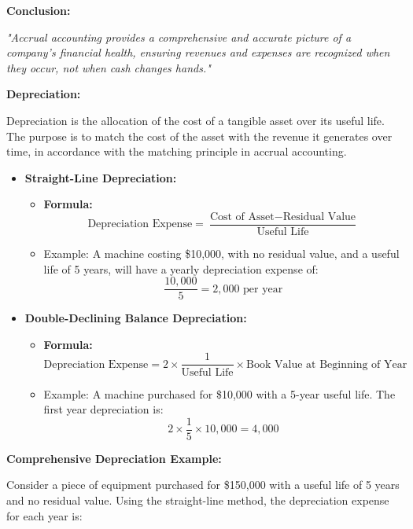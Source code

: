 \documentclass[12pt,a4paper]{book}
\begin{document}
\vspace{0.5cm}
\textbf{Conclusion:}

\textit{"Accrual accounting provides a comprehensive and accurate picture of a company's financial health, ensuring revenues and expenses are recognized when they occur, not when cash changes hands."}

\vspace{1cm}

\textbf{Depreciation:}

Depreciation is the allocation of the cost of a tangible asset over its useful life. The purpose is to match the cost of the asset with the revenue it generates over time, in accordance with the matching principle in accrual accounting.

\begin{itemize}
    \item \textbf{Straight-Line Depreciation:}
    \begin{itemize}
        \item \textbf{Formula:} 
        \[
        \text{Depreciation Expense} = \frac{\text{Cost of Asset} - \text{Residual Value}}{\text{Useful Life}}
        \]
        \item Example: A machine costing \$10,000, with no residual value, and a useful life of 5 years, will have a yearly depreciation expense of:
        \[
        \frac{10,000}{5} = 2,000 \text{ per year}
        \]
    \end{itemize}

    \item \textbf{Double-Declining Balance Depreciation:}
    \begin{itemize}
        \item \textbf{Formula:} 
        \[
        \text{Depreciation Expense} = 2 \times \frac{1}{\text{Useful Life}} \times \text{Book Value at Beginning of Year}
        \]
        \item Example: A machine purchased for \$10,000 with a 5-year useful life. The first year depreciation is:
        \[
        2 \times \frac{1}{5} \times 10,000 = 4,000
        \]
    \end{itemize}
\end{itemize}

\vspace{0.5cm}
\textbf{Comprehensive Depreciation Example:}

Consider a piece of equipment purchased for \$150,000 with a useful life of 5 years and no residual value. Using the straight-line method, the depreciation expense for each year is:
\end{document}
